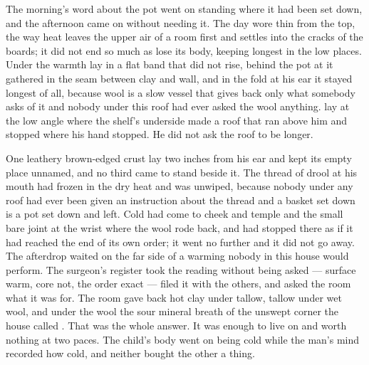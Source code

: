 The morning's word about the pot went on standing where it had been set down, and the afternoon came on without needing it. The day wore thin from the top, the way heat leaves the upper air of a room first and settles into the cracks of the boards; it did not end so much as lose its body, keeping longest in the low places. Under  the warmth lay in a flat band that did not rise, behind the pot at  it gathered in the seam between clay and wall, and in the fold at his ear it stayed longest of all, because wool is a slow vessel that gives back only what somebody asks of it and nobody under this roof had ever asked the wool anything.  lay at the low angle where the shelf's underside made a roof that ran above him and stopped where his hand stopped. He did not ask the roof to be longer.

One leathery brown-edged crust lay two inches from his ear and kept its empty place unnamed, and no third came to stand beside it. The thread of drool at his mouth had frozen in the dry heat and was unwiped, because nobody under any roof had ever been given an instruction about the thread and a basket set down is a pot set down and left. Cold had come to cheek and temple and the small bare joint at the wrist where the wool rode back, and had stopped there as if it had reached the end of its own order; it went no further and it did not go away. The afterdrop waited on the far side of a warming nobody in this house would perform. The surgeon's register took the reading without being asked --- surface warm, core not, the order exact --- filed it with the others, and asked the room what it was for. The room gave back hot clay under tallow, tallow under wet wool, and under the wool the sour mineral breath of the unswept corner the house called . That was the whole answer. It was enough to live on and worth nothing at two paces. The child's body went on being cold while the man's mind recorded how cold, and neither bought the other a thing.

\scenebreak

